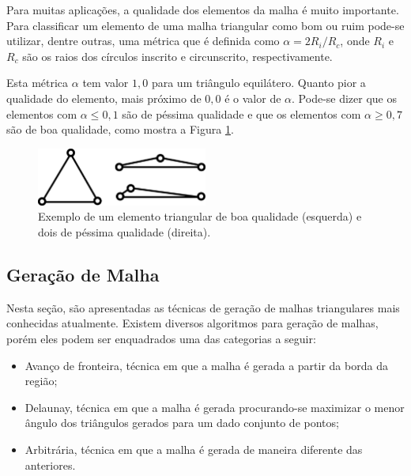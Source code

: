Para muitas aplicações, a qualidade dos elementos da malha é muito importante. Para classificar um elemento de uma malha triangular como bom ou ruim pode-se utilizar, dentre outras, uma métrica que é definida como $ \alpha = 2R_i / R_c $, onde $R_i$ e $R_c$ são os raios dos círculos inscrito e circunscrito, respectivamente. 
 
Esta métrica $\alpha$ tem valor $1,0$ para um triângulo equilátero. Quanto pior a qualidade do elemento, mais próximo de $0,0$ é o valor de $\alpha$. Pode-se dizer que os elementos com $\alpha \leq 0,1$ são de péssima qualidade e que os elementos com $\alpha \geq 0,7$ são de boa qualidade, como mostra a Figura \ref{fig:qualidade_elemento}.

 \begin{figure}[htbp]
     \centering
     \includegraphics[width=0.5\textwidth]{fig/qualidade_elemento.png}
     \caption{Exemplo de um elemento triangular de boa qualidade (esquerda) e dois de péssima qualidade (direita).} 
     \label{fig:qualidade_elemento}
 \end{figure}

\subsection{Geração de Malha}\label{Geração de Malha}

Nesta seção, são apresentadas as técnicas de geração de malhas triangulares mais conhecidas atualmente. Existem diversos algoritmos para geração de malhas, porém eles podem ser enquadrados uma das categorias a seguir:

\begin{itemize}
  \item Avanço de fronteira, técnica em que a malha é gerada a partir da borda da região;

  \item Delaunay, técnica em que a malha é gerada procurando-se maximizar o menor ângulo dos triângulos gerados para um dado conjunto de pontos;

  \item Arbitrária, técnica em que a malha é gerada de maneira diferente das anteriores.
\end{itemize}

